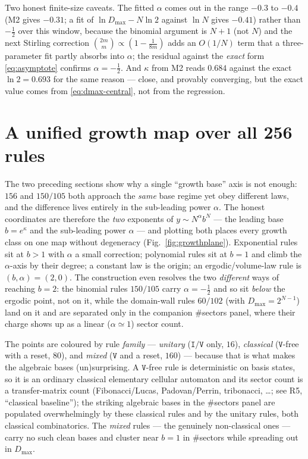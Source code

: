 \documentclass[11pt]{article}
\newcommand{\rt}[1]{\texttt{#1}}
\begin{document}
Two honest finite-size caveats. The fitted $\alpha$ comes out in the range
$-0.3$ to $-0.4$ (M2 gives $-0.31$; a fit of $\ln D_{\max}-N\ln2$ against
$\ln N$ gives $-0.41$) rather than $-\tfrac12$ over this window, because the
binomial argument is $N{+}1$
(not $N$) and the next Stirling correction $\binom{2m}{m}\!\propto\!(1-\tfrac{1}{8m})$
adds an $O(1/N)$ term that a three-parameter fit partly absorbs into $\alpha$;
the residual against the \emph{exact} form \eqref{eq:asymptote} confirms
$\alpha=-\tfrac12$. And $\kappa$ from M2 reads $0.684$ against the exact
$\ln 2=0.693$ for the same reason --- close, and provably converging, but the
exact value comes from \eqref{eq:dmax-central}, not from the regression.

\section{A unified growth map over all 256 rules}
\label{sec:growthmap}
The two preceding sections show why a single ``growth base'' axis is not enough:
$156$ and $150/105$ both approach the \emph{same} base regime yet obey different
laws, and the difference lives entirely in the sub-leading power $\alpha$. The
honest coordinates are therefore the \emph{two} exponents of $y\sim N^{\alpha}b^{N}$
--- the leading base $b=e^{\kappa}$ and the sub-leading power $\alpha$ --- and
plotting both places every growth class on one map without degeneracy
(Fig.~\ref{fig:growthplane}). Exponential rules sit at $b>1$ with $\alpha$ a small
correction; polynomial rules sit at $b=1$ and climb the $\alpha$-axis by their
degree; a constant law is the origin; an ergodic/volume-law rule is $(b,\alpha)=(2,0)$.
The construction even resolves the two \emph{different} ways of reaching $b=2$:
the binomial rules $150/105$ carry $\alpha=-\tfrac12$ and so sit \emph{below} the
ergodic point, not on it, while the domain-wall rules $60/102$ (with $D_{\max}=2^{N-1}$)
land on it and are separated only in the companion $\#$sectors panel, where their
charge shows up as a linear ($\alpha\simeq1$) sector count.

The points are coloured by rule \emph{family} --- \emph{unitary} ($\rt I/\rt V$
only, $16$), \emph{classical} ($\rt V$-free with a reset, $80$), and \emph{mixed}
($\rt V$ and a reset, $160$) --- because that is what makes the algebraic bases
(un)surprising. A $\rt V$-free rule is deterministic on basis states, so it is an
ordinary classical elementary cellular automaton and its sector count is a
transfer-matrix count (Fibonacci/Lucas, Padovan/Perrin, tribonacci, \dots; see
R5, ``classical baseline''); the striking algebraic bases in the $\#$sectors
panel are populated overwhelmingly by these classical rules and by the unitary
rules, both classical combinatorics. The \emph{mixed} rules --- the genuinely
non-classical ones --- carry no such clean bases and cluster near $b=1$ in
$\#$sectors while spreading out in $D_{\max}$.
\end{document}
